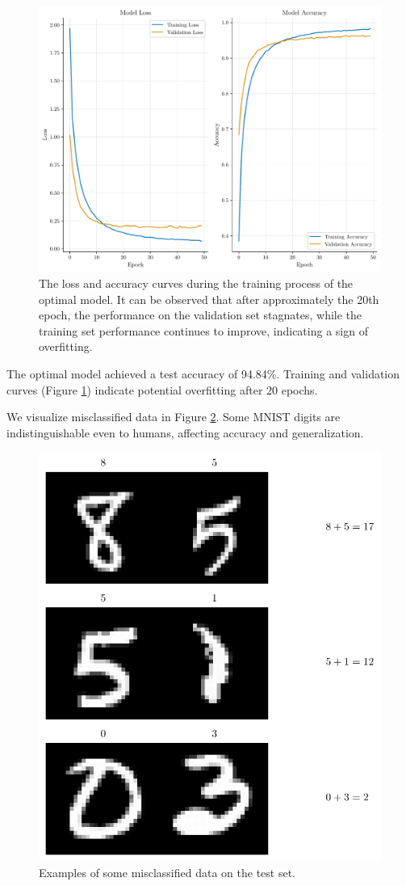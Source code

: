 \documentclass{article}
\begin{document}
\begin{figure}[!htbp]

    \centering
    \includegraphics[width=0.8\linewidth]{./images/training_history.pdf}
    \caption{The loss and accuracy curves during the training process of the optimal model. It can be observed that after approximately the 20th epoch, the performance on the validation set stagnates, while the training set performance continues to improve, indicating a sign of overfitting.
}
\label{fig:curves}
\end{figure}

The optimal model achieved a test accuracy of 94.84\%. Training and validation curves (Figure \ref{fig:curves}) indicate potential overfitting after 20 epochs.

We visualize misclassified data in Figure \ref{fig:misclassified}. Some MNIST digits are indistinguishable even to humans, affecting accuracy and generalization.

\begin{figure}[!htbp]
    \centering
    \includegraphics[width=0.6\linewidth]{./images/incorrect_predictions.pdf}
    \caption{Examples of some misclassified data on the test set.}
\label{fig:misclassified}
\end{figure}
\end{document}
